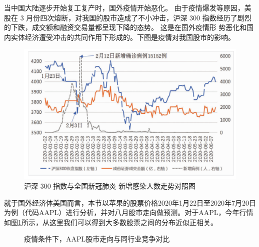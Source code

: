 \documentclass{whutmod}
\begin{document}
        当中国大陆逐步开始复工复产时，国外疫情开始恶化。 由于疫情爆发等原因，美股在 3 月份四次熔断，对我国的股市造成了不小冲击，沪深 300 指数经历了剧烈的下跌，成交额和融资交易量都呈现下降的态势。 这是在国外疫情形
        势恶化和国内实体经济遭受冲击的共同作用下形成的。下图是疫情对我国股市的影响。
        \begin{figure}[H]
        	\centering
        	\includegraphics[width=.8\textwidth]{figures/A6.png}
        	\caption{沪深 300 指数与全国新冠肺炎
        		新增感染人数走势对照图}
        \end{figure}
        
        
       就于国外经济体美国而言，本节以苹果的股票价格2020年1月22日至2020年7月20日为例（代码AAPL）进行分析，并对八月股市走向做预测。对于AAPL，今年行情如图\ref{lssssddsssssdssct}所示，从这里我们可以得到大多数股票之间的分布近似正相关。
   
    \begin{figure}[H]
   	\centering
   	\caption{疫情条件下，AAPL股市走向与同行业竞争对比}        	\label{lssssddsssssdssct}
   \end{figure}
\end{document}
